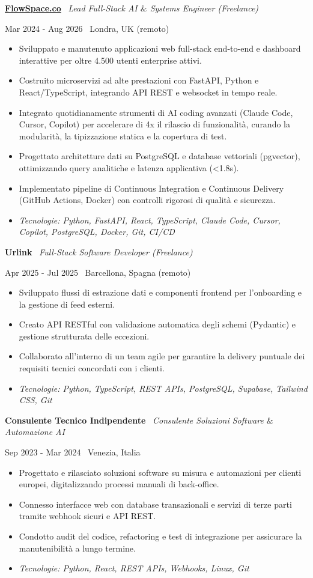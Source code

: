 \documentclass[a4paper,10pt]{article}
\newcommand{\role}[4]{%
  \vspace{2pt}\noindent
  \begin{minipage}[t]{0.70\textwidth}\raggedright\textbf{#1} \textbullet\ \textit{#3}\end{minipage}%
  \hfill
  \begin{minipage}[t]{0.28\textwidth}\raggedleft\footnotesize\color{gray}#2 \textbullet\ #4\end{minipage}%
  \vspace{1pt}%
}
\begin{document}
\role{\href{https://flowspace.co}{FlowSpace.co}}{Mar 2024 - Aug 2026}{Lead Full-Stack AI $\&$ Systems Engineer (Freelance)}{Londra, UK (remoto)}
\begin{itemize}
  \item Sviluppato e manutenuto applicazioni web full-stack end-to-end e dashboard interattive per oltre 4.500 utenti enterprise attivi.
  \item Costruito microservizi ad alte prestazioni con FastAPI, Python e React/TypeScript, integrando API REST e websocket in tempo reale.
  \item Integrato quotidianamente strumenti di AI coding avanzati (Claude Code, Cursor, Copilot) per accelerare di 4x il rilascio di funzionalità, curando la modularità, la tipizzazione statica e la copertura di test.
  \item Progettato architetture dati su PostgreSQL e database vettoriali (pgvector), ottimizzando query analitiche e latenza applicativa (<1.8s).
  \item Implementato pipeline di Continuous Integration e Continuous Delivery (GitHub Actions, Docker) con controlli rigorosi di qualità e sicurezza.
  \item \textit{Tecnologie: Python, FastAPI, React, TypeScript, Claude Code, Cursor, Copilot, PostgreSQL, Docker, Git, CI/CD}
\end{itemize}

\role{Urlink}{Apr 2025 - Jul 2025}{Full-Stack Software Developer (Freelance)}{Barcellona, Spagna (remoto)}
\begin{itemize}
  \item Sviluppato flussi di estrazione dati e componenti frontend per l'onboarding e la gestione di feed esterni.
  \item Creato API RESTful con validazione automatica degli schemi (Pydantic) e gestione strutturata delle eccezioni.
  \item Collaborato all'interno di un team agile per garantire la delivery puntuale dei requisiti tecnici concordati con i clienti.
  \item \textit{Tecnologie: Python, TypeScript, REST APIs, PostgreSQL, Supabase, Tailwind CSS, Git}
\end{itemize}

\role{Consulente Tecnico Indipendente}{Sep 2023 - Mar 2024}{Consulente Soluzioni Software $\&$ Automazione AI}{Venezia, Italia}
\begin{itemize}
  \item Progettato e rilasciato soluzioni software su misura e automazioni per clienti europei, digitalizzando processi manuali di back-office.
  \item Connesso interfacce web con database transazionali e servizi di terze parti tramite webhook sicuri e API REST.
  \item Condotto audit del codice, refactoring e test di integrazione per assicurare la manutenibilità a lungo termine.
  \item \textit{Tecnologie: Python, React, REST APIs, Webhooks, Linux, Git}
\end{itemize}
\end{document}
